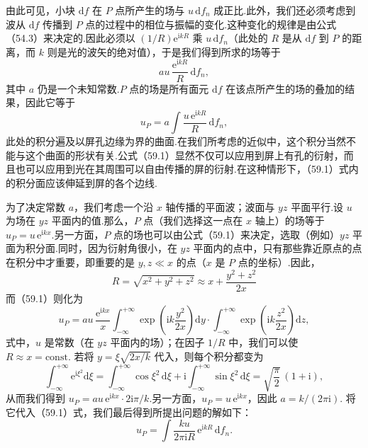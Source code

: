 由此可见，小块 $\mathrm{d}f$ 在 $P$ 点所产生的场与 $u\,\mathrm{d}f_n$ 成正比.此外，我们还必须考虑到波从 $\mathrm{d}f$ 传播到 $P$ 点的过程中的相位与振幅的变化.这种变化的规律是由公式（54.3）来决定的.因此必须以 $(1/R)\mathrm{e}^{\mathrm{i}kR}$ 乘 $u\,\mathrm{d}f_n$（此处的 $R$ 是从 $\mathrm{d}f$ 到 $P$ 的距离，而 $k$ 则是光的波矢的绝对值），于是我们得到所求的场等于
\begin{equation*}
  au\,\frac{\mathrm{e}^{\mathrm{i}kR}}{R}\,\mathrm{d}f_n,
\end{equation*}
其中 $a$ 仍是一个未知常数.$P$ 点的场是所有面元 $\mathrm{d}f$ 在该点所产生的场的叠加的结果，因此它等于
\begin{equation}
  u_P=a\int\frac{u\,\mathrm{e}^{\mathrm{i}kR}}{R}\,\mathrm{d}f_n,
\end{equation}
此处的积分遍及以屏孔边缘为界的曲面.在我们所考虑的近似中，这个积分当然不能与这个曲面的形状有关.公式（59.1）显然不仅可以应用到屏上有孔的衍射，而且也可以应用到光在其周围可以自由传播的屏的衍射.在这种情形下，（59.1）式内的积分面应该伸延到屏的各个边线.

为了决定常数 $a$，我们考虑一个沿 $x$ 轴传播的平面波；波面与 $yz$ 平面平行.设 $u$ 为场在 $yz$ 平面内的值.那么，$P$ 点（我们选择这一点在 $x$ 轴上）的场等于 $u_P=u\,\mathrm{e}^{\mathrm{i}kx}$.另一方面，$P$ 点的场也可以由公式（59.1）来决定，选取（例如）$yz$ 平面为积分面.同时，因为衍射角很小，在 $yz$ 平面内的点中，只有那些靠近原点的点在积分中才重要，即重要的是 $y,z\ll x$ 的点（$x$ 是 $P$ 点的坐标）.因此，
\begin{equation*}
  R=\sqrt{x^2+y^2+z^2}\approx x+\frac{y^2+z^2}{2x}
\end{equation*}
而（59.1）则化为
\begin{equation*}
  u_P=au\,\frac{\mathrm{e}^{\mathrm{i}kx}}{x}
  \int_{-\infty}^{+\infty}\exp\left(\mathrm{i}k\frac{y^2}{2x}\right)\mathrm{d}y
  \cdot\int_{-\infty}^{+\infty}\exp\left(\mathrm{i}k\frac{z^2}{2x}\right)\mathrm{d}z,
\end{equation*}
式中，$u$ 是常数（在 $yz$ 平面内的场）；在因子 $1/R$ 中，我们可以使 $R\approx x=\mathrm{const}$. 若将 $y=\xi\sqrt{2x/k}$ 代入，则每个积分都变为
\begin{equation*}
  \int_{-\infty}^{+\infty}\mathrm{e}^{\mathrm{i}\xi^2}\mathrm{d}\xi
  =\int_{-\infty}^{+\infty}\cos\xi^2\,\mathrm{d}\xi
  +\mathrm{i}\int_{-\infty}^{+\infty}\sin\xi^2\,\mathrm{d}\xi
  =\sqrt{\frac{\pi}{2}}\,(1+\mathrm{i}),
\end{equation*}
从而我们得到 $u_P=au\,\mathrm{e}^{\mathrm{i}kx}\cdot 2\mathrm{i}\pi/k$.另一方面，$u_P=u\,\mathrm{e}^{\mathrm{i}kx}$，因此 $a=k/(2\pi\mathrm{i})$. 将它代入（59.1）式，我们最后得到所提出问题的解如下：
\begin{equation}
  u_P=\int\frac{ku}{2\pi\mathrm{i}R}\,\mathrm{e}^{\mathrm{i}kR}\,\mathrm{d}f_n.
\end{equation}

